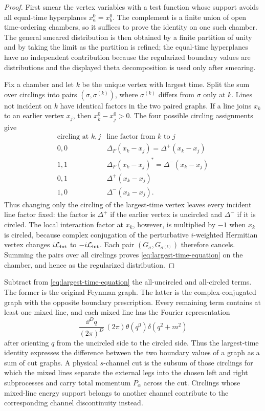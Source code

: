 \begin{proof}
First smear the vertex variables with a test function whose support avoids
all equal-time hyperplanes \(x_a^0=x_b^0\).  The complement is a finite union
of open time-ordering chambers, so it suffices to prove the identity on one
such chamber.  The general smeared distribution is then obtained by a finite
partition of unity and by taking the limit as the partition is refined; the
equal-time hyperplanes have no independent contribution because the
regularized boundary values are distributions and the displayed theta
decomposition is used only after smearing.

Fix a chamber and let \(k\) be the unique vertex with largest time.  Split
the sum over circlings into pairs \((\sigma,\sigma^{(k)})\), where
\(\sigma^{(k)}\) differs from \(\sigma\) only at \(k\).  Lines not incident
on \(k\) have identical factors in the two paired graphs.  If a line joins
\(x_k\) to an earlier vertex \(x_j\), then \(x_k^0-x_j^0>0\).  The four
possible circling assignments give
\[
\begin{array}{c|c}
  \text{circling at }k,j & \text{line factor from }k\text{ to }j\\ \hline
  0,0 & \Delta_F(x_k-x_j)=\Delta^+(x_k-x_j)\\
  1,1 & \Delta_F(x_k-x_j)^*=\Delta^-(x_k-x_j)\\
  0,1 & \Delta^+(x_k-x_j)\\
  1,0 & \Delta^-(x_k-x_j).
\end{array}
\]
Thus changing only the circling of the largest-time vertex leaves every
incident line factor fixed: the factor is \(\Delta^+\) if the earlier vertex
is uncircled and \(\Delta^-\) if it is circled.  The local interaction factor
at \(x_k\), however, is multiplied by \(-1\) when \(x_k\) is circled,
because complex conjugation of the perturbative \(i\)-weighted Hermitian
vertex changes \(i\mathcal L_{\rm int}\) to \(-i\mathcal L_{\rm int}\).
Each pair \((G_\sigma,G_{\sigma^{(k)}})\) therefore cancels.  Summing the
pairs over all circlings proves \eqref{eq:largest-time-equation} on the
chamber, and hence as the regularized distribution.
\end{proof}

Subtract from \eqref{eq:largest-time-equation} the all-uncircled and
all-circled terms.  The former is the original Feynman graph.  The latter is
the complex-conjugated graph with the opposite boundary prescription.  Every
remaining term contains at least one mixed line, and each mixed line has the
Fourier representation
\[
  \frac{\dd^D q}{(2\pi)^D}\,
  (2\pi)\theta(q^0)\delta(q^2+m^2)
\]
after orienting \(q\) from the uncircled side to the circled side.  Thus the
largest-time identity expresses the difference between the two boundary
values of a graph as a sum of cut graphs.  A physical \(s\)-channel cut is the
subsum of those circlings for which the mixed lines separate the external
legs into the chosen left and right subprocesses and carry total momentum
\(P_\alpha\) across the cut.  Circlings whose mixed-line energy support
belongs to another channel contribute to the corresponding channel
discontinuity instead.


